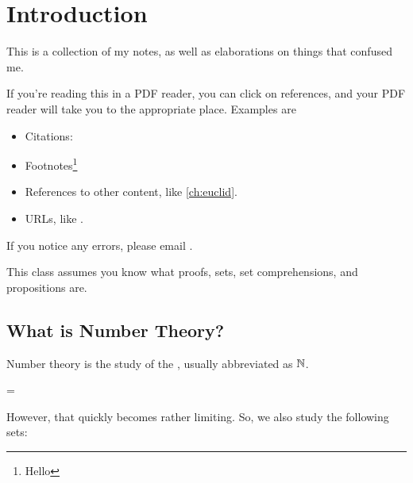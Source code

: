 \chapter{Introduction}

This is a collection of my notes, as well as elaborations on things
that confused me.

If you're reading this in a PDF reader, you can click on references,
and your PDF reader will take you to the appropriate place. Examples
are

\begin{itemize}
\item Citations: \cite{savin}
\item Footnotes\footnote{Hello}
\item References to other content, like \cref{ch:euclid}.
\item URLs, like .
\end{itemize}

If you notice any errors, please email
.

This class assumes you know what proofs, sets, set comprehensions, and
propositions are.

\section{What is Number Theory?}

Number theory is the study of the , usually
abbreviated as $\mathbb{N}$.

\begin{zz}
  \N = 
\end{zz}

However, that quickly becomes rather limiting. So, we also study the
following sets:

